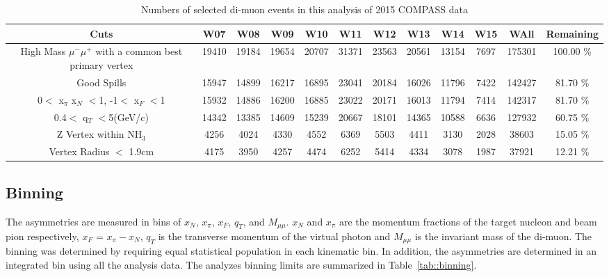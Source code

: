 \begin{table}[h!t]
  \begin{adjustwidth}{-2cm}{}
    \begin{tabular}{ |c|c|c|c|c|c|c|c|c|c|c|c| }
      \hline \textbf{Cuts}& \textbf{W07}& \textbf{W08}& \textbf{W09}&
      \textbf{W10}& \textbf{W11}& \textbf{W12}& \textbf{W13}& \textbf{W14}&
      \textbf{W15} & \textbf{WAll} & \textbf{Remaining} \\ \hline

      \multirow{2}{13em}{High Mass $\mu^-\mu^+$ with a common best primary
        vertex}& 19410& 19184& 19654& 20707& 31371& 23563& 20561& 13154& 7697&
      175301& 100.00 \% \\ & & & & & & & & & & & \\ \hline
      
      Good Spills& 15947& 14899& 16217& 16895& 23041& 20184& 16026& 11796& 7422&
      142427& 81.70 \% \\ \hline

      0$<$ x$_{\pi}$ x$_N$ $<$1, -1$<$ x$_F$ $<$1& 15932& 14886& 16200& 16885&
      23022& 20171& 16013& 11794& 7414& 142317& 81.70 \% \\ \hline

      0.4$<$ q$_T$ $<$5(GeV/c)& 14342& 13385& 14609& 15239& 20667& 18101& 14365&
      10588& 6636& 127932& 60.75 \% \\ \hline

      Z Vertex within NH$_3$& 4256& 4024& 4330& 4552& 6369& 5503& 4411& 3130&
      2028& 38603& 15.05 \% \\ \hline

      Vertex Radius $<$ 1.9cm& 4175& 3950& 4257& 4474& 6252& 5414& 4334& 3078&
      1987& 37921& 12.21 \% \\ \hline
      
    \end{tabular}
    \caption{Numbers of selected di-muon events in this analysis of 2015 COMPASS
      data}
    \label{tab::EventTable}
  \end{adjustwidth}
\end{table}

\subsection{Binning}
The asymmetries are measured in bins of $x_N$, $x_{\pi}$, $x_F$,
$q_T$, and $M_{\mu\mu}$. $x_N$ and $x_{\pi}$ are the momentum
fractions of the target nucleon and beam pion respectively, $x_F$ =
$x_{\pi} - x_N$, $q_T$ is the transverse momentum of the virtual
photon and $M_{\mu\mu}$ is the invariant mass of the di-muon.  The binning was
determined by requiring equal statistical population in each kinematic bin.  In
addition, the asymmetries are determined in an integrated bin using all the
analysis data.  The analyzes binning limits are summarized in
Table~\ref{tab::binning}.

